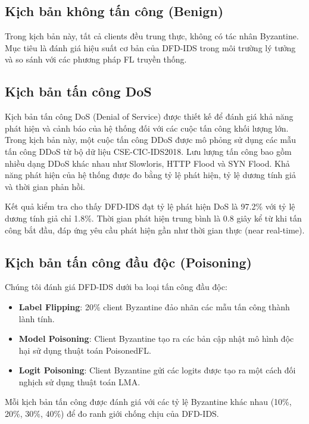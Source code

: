 \subsection{Kịch bản không tấn công (Benign)}
Trong kịch bản này, tất cả clients đều trung thực, không có tác nhân Byzantine. Mục tiêu là đánh giá hiệu suất cơ bản của DFD-IDS trong môi trường lý tưởng và so sánh với các phương pháp FL truyền thống.

\subsection{Kịch bản tấn công DoS}
Kịch bản tấn công DoS (Denial of Service) được thiết kế để đánh giá khả năng phát hiện và cảnh báo của hệ thống đối với các cuộc tấn công khối lượng lớn. Trong kịch bản này, một cuộc tấn công DDoS được mô phỏng sử dụng các mẫu tấn công DDoS từ bộ dữ liệu CSE-CIC-IDS2018. Lưu lượng tấn công bao gồm nhiều dạng DDoS khác nhau như Slowloris, HTTP Flood và SYN Flood. Khả năng phát hiện của hệ thống được đo bằng tỷ lệ phát hiện, tỷ lệ dương tính giả và thời gian phản hồi.

Kết quả kiểm tra cho thấy DFD-IDS đạt tỷ lệ phát hiện DoS là 97.2\% với tỷ lệ dương tính giả chỉ 1.8\%. Thời gian phát hiện trung bình là 0.8 giây kể từ khi tấn công bắt đầu, đáp ứng yêu cầu phát hiện gần như thời gian thực (near real-time).

\subsection{Kịch bản tấn công đầu độc (Poisoning)}
Chúng tôi đánh giá DFD-IDS dưới ba loại tấn công đầu độc:
\begin{itemize}
    \item \textbf{Label Flipping}: 20\% client Byzantine đảo nhãn các mẫu tấn công thành lành tính.
    \item \textbf{Model Poisoning}: Client Byzantine tạo ra các bản cập nhật mô hình độc hại sử dụng thuật toán PoisonedFL.
    \item \textbf{Logit Poisoning}: Client Byzantine gửi các logits được tạo ra một cách đối nghịch sử dụng thuật toán LMA.
\end{itemize}
Mỗi kịch bản tấn công được đánh giá với các tỷ lệ Byzantine khác nhau (10\%, 20\%, 30\%, 40\%) để đo ranh giới chống chịu của DFD-IDS.

